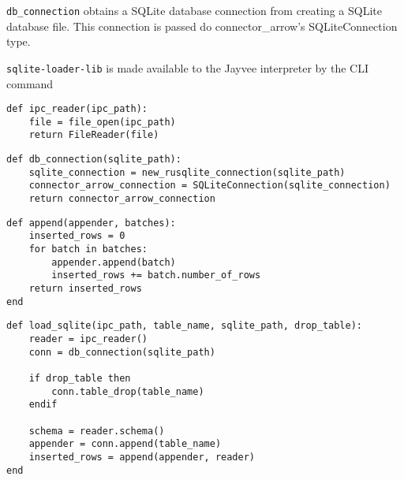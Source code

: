 \Verb|db_connection| obtains a SQLite database connection from creating a SQLite database file.
This connection is passed do connector\_arrow's SQLiteConnection type.

\Verb|sqlite-loader-lib| is made available to the Jayvee interpreter by the \ac{CLI} command

\begin{listing}
	\begin{verbatim}
def ipc_reader(ipc_path):
	file = file_open(ipc_path)
	return FileReader(file)
	\end{verbatim}
\end{listing}

\begin{listing}
	\begin{verbatim}
def db_connection(sqlite_path):
	sqlite_connection = new_rusqlite_connection(sqlite_path)
	connector_arrow_connection = SQLiteConnection(sqlite_connection)
	return connector_arrow_connection
	\end{verbatim}
\end{listing}

\begin{listing}
	\begin{verbatim}
def append(appender, batches):
	inserted_rows = 0
	for batch in batches:
		appender.append(batch)
		inserted_rows += batch.number_of_rows
	return inserted_rows
end
	\end{verbatim}
\end{listing}

\begin{listing}
	\begin{verbatim}
def load_sqlite(ipc_path, table_name, sqlite_path, drop_table):
	reader = ipc_reader()
	conn = db_connection(sqlite_path)

	if drop_table then
		conn.table_drop(table_name)
	endif

	schema = reader.schema()
	appender = conn.append(table_name)
	inserted_rows = append(appender, reader)
end
	\end{verbatim}
\end{listing}


